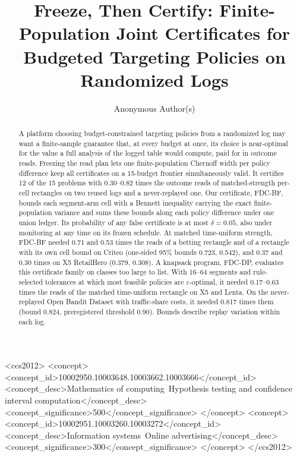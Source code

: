 \documentclass[sigconf,anonymous,review]{acmart}
\newcommand{\eps}{\varepsilon}
\begin{document}
\title{Freeze, Then Certify: Finite-Population Joint Certificates for Budgeted Targeting Policies on Randomized Logs}

\author{Anonymous Author(s)}

\begin{abstract}
A platform choosing budget-constrained targeting policies from a randomized log may want a finite-sample guarantee that, at every budget at once, its choice is near-optimal for the value a full analysis of the logged table would compute, paid for in outcome reads. Freezing the read plan lets one finite-population Chernoff width per policy difference keep all certificates on a 15-budget frontier simultaneously valid. It certifies 12 of the 15 problems with 0.30--0.82 times the outcome reads of matched-strength per-cell rectangles on two reused logs and a never-replayed one. Our certificate, FDC-BF, bounds each segment-arm cell with a Bennett inequality carrying the exact finite-population variance and sums these bounds along each policy difference under one union ledger. Its probability of any false certificate is at most $\delta = 0.05$, also under monitoring at any time on its frozen schedule. At matched time-uniform strength, FDC-BF needed 0.71 and 0.53 times the reads of a betting rectangle and of a rectangle with its own cell bound on Criteo (one-sided 95\% bounds 0.723, 0.542), and 0.37 and 0.30 times on X5 RetailHero (0.379, 0.308). A knapsack program, FDC-DP, evaluates this certificate family on classes too large to list. With 16--64 segments and rule-selected tolerances at which most feasible policies are $\eps$-optimal, it needed 0.17--0.63 times the reads of the matched time-uniform rectangle on X5 and Lenta. On the never-replayed Open Bandit Dataset with traffic-share costs, it needed 0.817 times them (bound 0.824, preregistered threshold 0.90). Bounds describe replay variation within each log.
\end{abstract}

\begin{CCSXML}
<ccs2012>
 <concept>
  <concept_id>10002950.10003648.10003662.10003666</concept_id>
  <concept_desc>Mathematics of computing~Hypothesis testing and confidence interval computation</concept_desc>
  <concept_significance>500</concept_significance>
 </concept>
 <concept>
  <concept_id>10002951.10003260.10003272</concept_id>
  <concept_desc>Information systems~Online advertising</concept_desc>
  <concept_significance>300</concept_significance>
 </concept>
</ccs2012>
\end{CCSXML}
\end{document}
